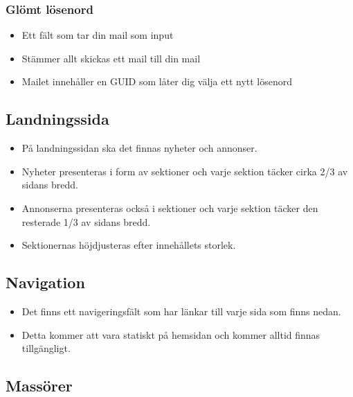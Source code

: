 \documentclass[11pt, titlepage, oneside, a4paper]{article}	%
\begin{document}
	\subsubsection*{Glömt lösenord}
	\begin{itemize}
		\item Ett fält som tar din mail som input
		\item Stämmer allt skickas ett mail till din mail
		\item Mailet innehåller en GUID som låter dig välja ett nytt lösenord
	\end{itemize} 

\subsection{Landningssida}
	\begin{itemize}
		\item På landningssidan ska det finnas nyheter och annonser.
		\item Nyheter presenteras i form av sektioner och varje sektion täcker cirka 2/3 av sidans bredd.
		\item Annonserna presenteras också i sektioner och varje sektion täcker den resterade 1/3 av sidans bredd.
		\item Sektionernas höjdjusteras efter innehållets storlek.
	\end{itemize} 

\subsection{Navigation}
	\begin{itemize}
		\item Det finns ett navigeringsfält som har länkar till varje sida som finns nedan. 
		\item Detta kommer att vara statiskt på hemsidan och kommer alltid finnas tillgängligt.
	\end{itemize} 


\newpage
\subsection{Massörer}
\end{document}
